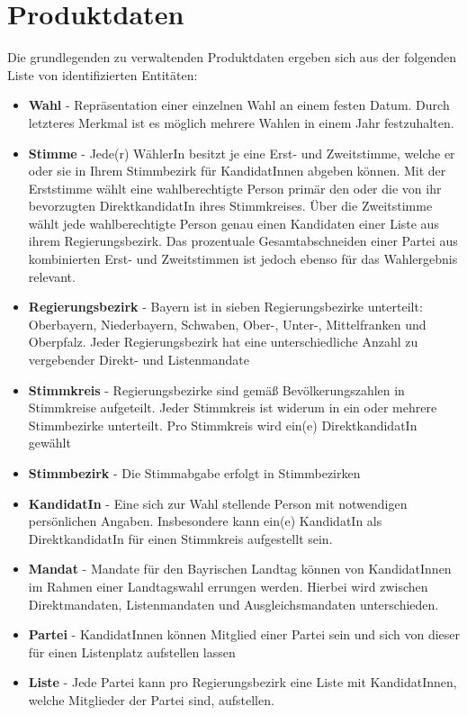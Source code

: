 \documentclass[a4paper,12pt]{article}
\begin{document}
\section{Produktdaten}
Die grundlegenden zu verwaltenden Produktdaten ergeben sich aus der folgenden Liste von
identifizierten Entitäten:
\begin{itemize}
  \item \textbf{Wahl} - Repräsentation einer einzelnen Wahl an einem festen Datum. 
        Durch letzteres Merkmal ist es möglich mehrere Wahlen in einem Jahr festzuhalten.
  \item \textbf{Stimme} - Jede(r) WählerIn besitzt je eine Erst- und Zweitstimme, welche er oder sie in Ihrem
        Stimmbezirk für KandidatInnen abgeben können. Mit der Erststimme wählt eine wahlberechtigte Person
        primär den oder die von ihr bevorzugten DirektkandidatIn ihres Stimmkreises. Über die Zweitstimme wählt 
        jede wahlberechtigte Person genau einen Kandidaten einer Liste aus ihrem Regierungsbezirk. Das prozentuale
        Gesamtabschneiden einer Partei aus kombinierten Erst- und Zweitstimmen ist jedoch ebenso für das 
        Wahlergebnis relevant.
  \item \textbf{Regierungsbezirk} - Bayern ist in sieben Regierungsbezirke unterteilt: Oberbayern,
        Niederbayern, Schwaben, Ober-, Unter-, Mittelfranken und Oberpfalz. Jeder Regierungsbezirk
        hat eine unterschiedliche Anzahl zu vergebender Direkt- und Listenmandate
  \item \textbf{Stimmkreis} - Regierungsbezirke sind gemäß Bevölkerungszahlen in Stimmkreise aufgeteilt.
        Jeder Stimmkreis ist widerum in ein oder mehrere Stimmbezirke unterteilt. Pro Stimmkreis wird ein(e)
        DirektkandidatIn gewählt
  \item \textbf{Stimmbezirk} - Die Stimmabgabe erfolgt in Stimmbezirken
  \item \textbf{KandidatIn} - Eine sich zur Wahl stellende Person mit notwendigen persönlichen Angaben. 
        Insbesondere kann ein(e) KandidatIn als DirektkandidatIn für einen Stimmkreis aufgestellt sein.
  \item \textbf{Mandat} - Mandate für den Bayrischen Landtag können von KandidatInnen im Rahmen einer Landtagswahl
        errungen werden. Hierbei wird zwischen Direktmandaten, Listenmandaten und Ausgleichsmandaten unterschieden.
  \item \textbf{Partei} - KandidatInnen können Mitglied einer Partei sein und sich von dieser für einen Listenplatz
        aufstellen lassen
  \item \textbf{Liste} - Jede Partei kann pro Regierungsbezirk eine Liste mit KandidatInnen, welche Mitglieder der 
        Partei sind, aufstellen.
\end{itemize}
\end{document}
